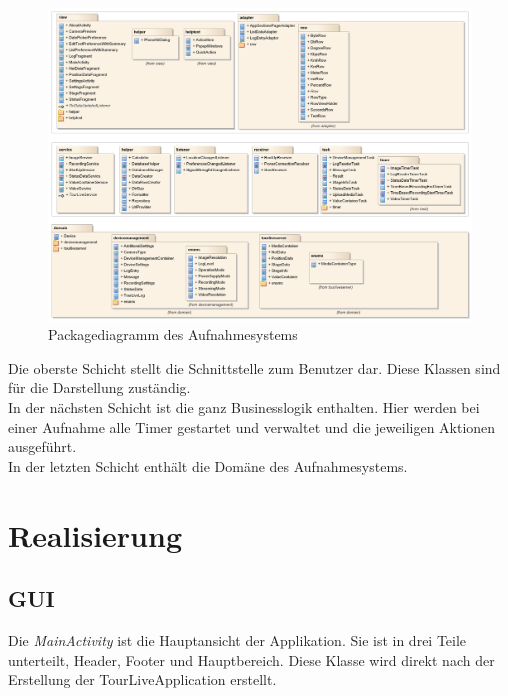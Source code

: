 \begin{figure}[H]
	\centering
	\includegraphics[width=150mm]{images/android/schichten.jpg}
	\caption{Packagediagramm des Aufnahmesystems}
\end{figure}

Die oberste Schicht stellt die Schnittstelle zum Benutzer dar. Diese Klassen sind für die Darstellung zuständig.\\
In der nächsten Schicht ist die ganz Businesslogik enthalten. Hier werden bei einer Aufnahme alle Timer gestartet und verwaltet und die jeweiligen Aktionen ausgeführt. \\
In der letzten Schicht enthält die Domäne des Aufnahmesystems.

\section{Realisierung}

\subsection{GUI}
Die \textit{MainActivity} ist die Hauptansicht der Applikation. Sie ist in drei Teile unterteilt, Header, Footer und Hauptbereich. Diese Klasse wird direkt nach der Erstellung der TourLiveApplication erstellt.

